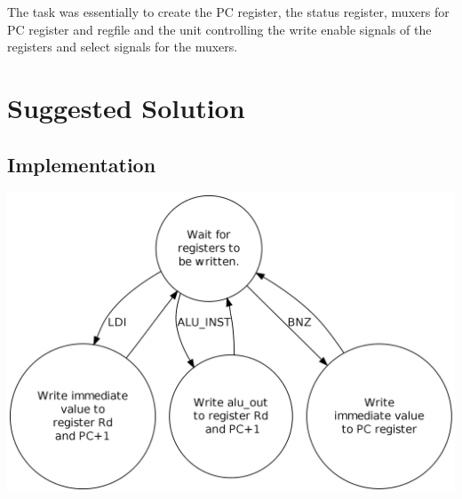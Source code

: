 \documentclass[10pt]{report}
\begin{document}
	The task was essentially to create the PC register, the status register, muxers for PC register and regfile and the unit controlling the write enable signals of the registers and select signals for the muxers. 

	\section*{Suggested Solution}


	\subsection*{Implementation}

	

	\begin{center}
	\includegraphics[width=.75\linewidth]{state_diagram.png} \\
	\end{center}
\end{document}
